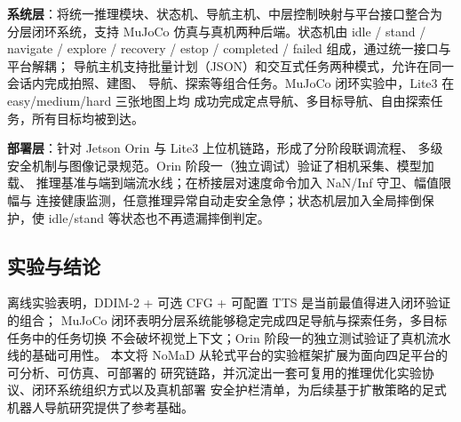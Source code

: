 \begin{digest}[zh]
\textbf{系统层}：将统一推理模块、状态机、导航主机、中层控制映射与平台接口整合为
分层闭环系统，支持 MuJoCo 仿真与真机两种后端。状态机由 idle / stand / navigate /
explore / recovery / estop / completed / failed 组成，通过统一接口与平台解耦；
导航主机支持批量计划（JSON）和交互式任务两种模式，允许在同一会话内完成拍照、建图、
导航、探索等组合任务。MuJoCo 闭环实验中，Lite3 在 easy/medium/hard 三张地图上均
成功完成定点导航、多目标导航、自由探索任务，所有目标均被到达。

\textbf{部署层}：针对 Jetson Orin 与 Lite3 上位机链路，形成了分阶段联调流程、
多级安全机制与图像记录规范。Orin 阶段一（独立调试）验证了相机采集、模型加载、
推理基准与端到端流水线；在桥接层对速度命令加入 NaN/Inf 守卫、幅值限幅与
连接健康监测，任意推理异常自动走安全急停；状态机层加入全局摔倒保护，使
idle/stand 等状态也不再遗漏摔倒判定。

\subsection*{实验与结论}

离线实验表明，DDIM-2 + 可选 CFG + 可配置 TTS 是当前最值得进入闭环验证的组合；
MuJoCo 闭环表明分层系统能够稳定完成四足导航与探索任务，多目标任务中的任务切换
不会破坏视觉上下文；Orin 阶段一的独立测试验证了真机流水线的基础可用性。
本文将 NoMaD 从轮式平台的实验框架扩展为面向四足平台的可分析、可仿真、可部署的
研究链路，并沉淀出一套可复用的推理优化实验协议、闭环系统组织方式以及真机部署
安全护栏清单，为后续基于扩散策略的足式机器人导航研究提供了参考基础。

\end{digest}

